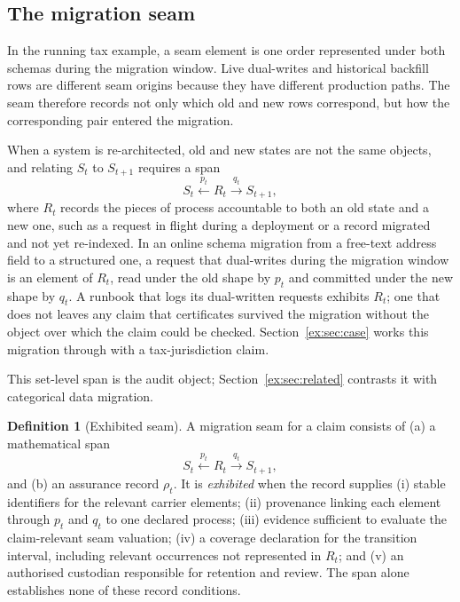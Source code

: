 \documentclass[11pt]{article}
\theoremstyle{definition}
\newtheorem{definition}{Definition}[section]
\begin{document}
\subsection{The migration seam}\label{ex:sec:migration-seam}

In the running tax example, a seam element is one order represented under both schemas during the migration window. Live dual-writes and historical backfill rows are different seam origins because they have different production paths. The seam therefore records not only which old and new rows correspond, but how the corresponding pair entered the migration.

When a system is re-architected, old and new states are not the same objects, and relating $S_t$ to $S_{t+1}$ requires a span
\[
S_t \xleftarrow{\;p_t\;} R_t \xrightarrow{\;q_t\;} S_{t+1},
\]
where $R_t$ records the pieces of process accountable to both an old state and a new one, such as a request in flight during a deployment or a record migrated and not yet re-indexed. In an online schema migration from a free-text address field to a structured one, a request that dual-writes during the migration window is an element of $R_t$, read under the old shape by $p_t$ and committed under the new shape by $q_t$. A runbook that logs its dual-written requests exhibits $R_t$; one that does not leaves any claim that certificates survived the migration without the object over which the claim could be checked. Section~\ref{ex:sec:case} works this migration through with a tax-jurisdiction claim.

This set-level span is the audit object; Section~\ref{ex:sec:related} contrasts it with categorical data migration.

\begin{definition}[Exhibited seam]\label{ex:def:exhibited-seam}
A migration seam for a claim consists of (a) a mathematical span
\[
S_t\xleftarrow{p_t}R_t\xrightarrow{q_t}S_{t+1},
\]
and (b) an assurance record $\rho_t$. It is \emph{exhibited} when the record supplies (i) stable identifiers for the relevant carrier elements; (ii) provenance linking each element through $p_t$ and $q_t$ to one declared process; (iii) evidence sufficient to evaluate the claim-relevant seam valuation; (iv) a coverage declaration for the transition interval, including relevant occurrences not represented in $R_t$; and (v) an authorised custodian responsible for retention and review. The span alone establishes none of these record conditions.
\end{definition}
\end{document}
